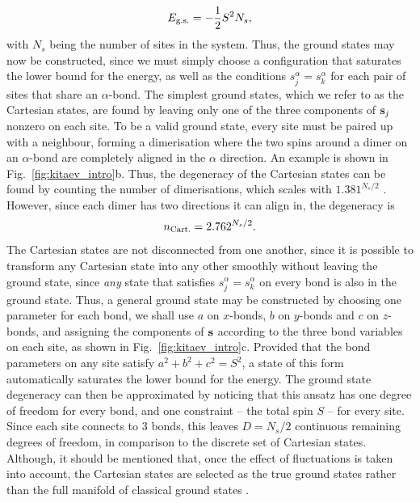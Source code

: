 \begin{align}
    E_\textup{g.s.} = -\frac 12 S^2 N_s,
\end{align}
with $N_s$ being the number of sites in the system. Thus, the ground states may now be constructed, since we must simply choose a configuration that saturates the lower bound for the energy, as well as the conditions $s^\alpha_j = s^\alpha_k$ for each pair of sites that share an $\alpha$-bond. The simplest ground states, which we refer to as the Cartesian states, are found by leaving only one of the three components of $\textbf s_j$ nonzero on each site. To be a valid ground state, every site must be paired up with a neighbour, forming a dimerisation where the two spins around a dimer on an $\alpha$-bond are completely aligned in the $\alpha$ direction. An example is shown in Fig.~\ref{fig:kitaev_intro}b. Thus, the degeneracy of the Cartesian states can be found by counting the number of dimerisations, which scales with $1.381^{N_s/2}$ \cite{wannier_antiferromagnetism_1950, kasteleyn_dimer_1963}. However, since each dimer has two directions it can align in, the degeneracy is
\begin{align}
    n_{\textup{Cart.}} = 2.762^{N_s/2}.
\end{align}
The Cartesian states are not disconnected from one another, since it is possible to transform any Cartesian state into any other smoothly without leaving the ground state, since \emph{any} state that satisfies $s^\alpha_j = s^\alpha_k$ on every bond is also in the ground state. Thus, a general ground state may be constructed by choosing one parameter for each bond, we shall use $a$ on $x$-bonds, $b$ on $y$-bonds and $c$ on $z$-bonds, and assigning the components of $\textbf s$ according to the three bond variables on each site, as shown in Fig.~\ref{fig:kitaev_intro}c. Provided that the bond parameters on any site satisfy $a^2 + b^2 + c^2 = S^2$, a state of this form automatically saturates the lower bound for the energy. The ground state degeneracy can then be approximated by noticing that this ansatz has one degree of freedom for every bond, and one constraint -- the total spin $S$ -- for every site. Since each site connects to 3 bonds, this leaves $D = N_s/2$ continuous remaining degrees of freedom, in comparison to the discrete set of Cartesian states. Although, it should be mentioned that, once the effect of fluctuations is taken into account, the Cartesian states are selected as the true ground states rather than the full manifold of classical ground states \cite{rousochatzakis_quantum_2018}.

